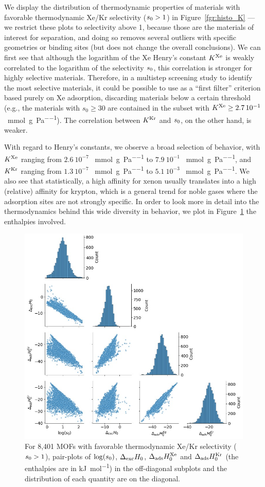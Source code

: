 \documentclass[main.tex]{subfiles}
\begin{document}
We display the distribution of thermodynamic properties of materials with favorable thermodynamic Xe/Kr selectivity ($s_{\text{0}} > 1$) in Figure~\ref{fgr:histo_K} --- we restrict these plots to selectivity above 1, because those are the materials of interest for separation, and doing so removes several outliers with specific geometries or binding sites (but does not change the overall conclusions). We can first see that although the logarithm of the Xe Henry's constant $K^{\text{Xe}}$ is weakly correlated to the logarithm of the selectivity $s_{\text{0}}$, this correlation is stronger for highly selective materials. Therefore, in a multistep screening study to identify the most selective materials, it could be possible to use as a ``first filter'' criterion based purely on Xe adsorption, discarding materials below a certain threshold (e.g., the materials with $s_0\ge30$ are contained in the subset with $K^{\text{Xe}}\ge2.7\,10^{-1}$~\si{\milli\mol\per\gram\per\pascal}). The correlation between $K^{\text{Kr}}$ and $s_{\text{0}}$, on the other hand, is weaker.

With regard to Henry's constants, we observe a broad selection of behavior, with $K^{\text{Xe}}$ ranging from $2.6\ 10^{-7}$ \SI{}{\milli\mol\per\gram\per\pascal} to $7.9\ 10^{-1}$ \SI{}{\milli\mol\per\gram\per\pascal}, and $K^{\text{Kr}}$ ranging from $1.3\ 10^{-7}$ \SI{}{\milli\mol\per\gram\per\pascal} to $5.1\ 10^{-3}$ \SI{}{\milli\mol\per\gram\per\pascal}. We also see that statistically, a high affinity for xenon usually translates into a high (relative) affinity for krypton, which is a general trend for noble gases where the adsorption sites are not strongly specific. In order to look more in detail into the thermodynamics behind this wide diversity in behavior, we plot in Figure~\ref{fgr:histo_H} the enthalpies involved.


\begin{figure}[t]
\centering
  \includegraphics[width=0.7\linewidth]{figures/2-thermo/Enthalpy_0_log.jpg}
  \caption{For 8,401 MOFs with favorable thermodynamic Xe/Kr selectivity ($s_{\text{0}} > 1$), pair-plots of $\log(s_{\text{0}})$, $\Delta_{\text{exc}}H_{\text{0}}$, $\Delta_{\text{ads}}H^{\text{Xe}}_{\text{0}}$ and $\Delta_{\text{ads}}H^{\text{Kr}}_{\text{0}}$ (the enthalpies are in \si{\kilo\joule\per\mol}) in the off-diagonal subplots and the distribution of each quantity are on the diagonal.}
  \label{fgr:histo_H}
\end{figure}
\end{document}
